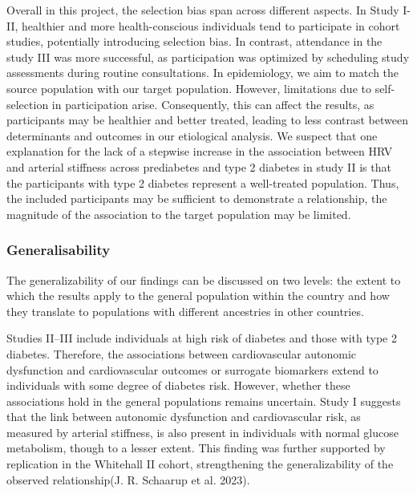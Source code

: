 \documentclass[
  a4paper,
  headsepline=true,
  open=any]{scrbook}
\begin{document}
Overall in this project, the selection bias span across different
aspects. In Study I-II, healthier and more health-conscious individuals
tend to participate in cohort studies, potentially introducing selection
bias. In contrast, attendance in the study III was more successful, as
participation was optimized by scheduling study assessments during
routine consultations. In epidemiology, we aim to match the source
population with our target population. However, limitations due to
self-selection in participation arise. Consequently, this can affect the
results, as participants may be healthier and better treated, leading to
less contrast between determinants and outcomes in our etiological
analysis. We suspect that one explanation for the lack of a stepwise
increase in the association between HRV and arterial stiffness across
prediabetes and type 2 diabetes in study II is that the participants
with type 2 diabetes represent a well-treated population. Thus, the
included participants may be sufficient to demonstrate a relationship,
the magnitude of the association to the target population may be
limited.

\hypertarget{generalisability}{%
\subsubsection{Generalisability}\label{generalisability}}

The generalizability of our findings can be discussed on two levels: the
extent to which the results apply to the general population within the
country and how they translate to populations with different ancestries
in other countries.

Studies II--III include individuals at high risk of diabetes and those
with type 2 diabetes. Therefore, the associations between cardiovascular
autonomic dysfunction and cardiovascular outcomes or surrogate
biomarkers extend to individuals with some degree of diabetes risk.
However, whether these associations hold in the general populations
remains uncertain. Study I suggests that the link between autonomic
dysfunction and cardiovascular risk, as measured by arterial stiffness,
is also present in individuals with normal glucose metabolism, though to
a lesser extent. This finding was further supported by replication in
the Whitehall II cohort, strengthening the generalizability of the
observed relationship(J. R. Schaarup et al. 2023).
\end{document}

